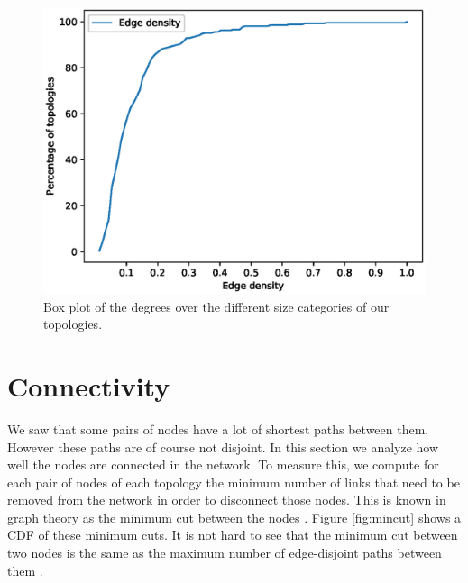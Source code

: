 \begin{figure}
\begin{center}
\includegraphics[width=.85\columnwidth]{./Network-lib/data/plot/edge_density.eps}
\end{center}
\caption{Box plot of the degrees over the different size categories of our topologies.}
\label{fig:density_cdf}
\end{figure}

\section{Connectivity}

We saw that some pairs of nodes have a lot of shortest paths between them. However these paths are of course not disjoint.
In this section we analyze how well the nodes are connected in the network. To measure this, we compute for each pair of nodes of each
topology the minimum number of links that need to be removed from the network in order to disconnect those nodes. This is known in graph
theory as the minimum cut between the nodes \cite{Ahuja}. Figure \ref{fig:mincut} shows a CDF of these minimum cuts. It is not hard to see
that the minimum cut between two nodes is the same as the maximum number of edge-disjoint paths between them \cite{Ahuja}.

